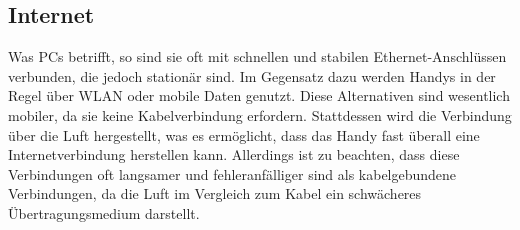 \subsection{Internet}\label{PcVsPhone:Internet}
Was PCs betrifft, so sind sie oft mit schnellen und stabilen Ethernet-Anschlüssen verbunden, die jedoch stationär sind. %
Im Gegensatz dazu werden Handys in der Regel über WLAN oder mobile Daten genutzt. Diese Alternativen sind wesentlich mobiler, da sie keine Kabelverbindung erfordern. Stattdessen wird die Verbindung über die Luft hergestellt, was es ermöglicht, dass das Handy fast überall eine Internetverbindung herstellen kann. Allerdings ist zu beachten, dass diese Verbindungen oft langsamer und fehleranfälliger sind als kabelgebundene Verbindungen, da die Luft im Vergleich zum Kabel ein schwächeres Übertragungsmedium darstellt.%
%
%
%	
%	
%	
%
